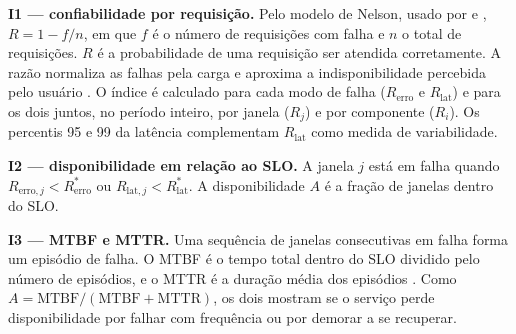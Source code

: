 \textbf{I1 — confiabilidade por requisição.} Pelo modelo de Nelson, usado
por  e , $R = 1-f/n$, em que $f$ é o número de requisições com falha e $n$ o total de
requisições. $R$ é a probabilidade de uma requisição ser atendida
corretamente. A razão normaliza as falhas pela carga \cite{tian2004} e
aproxima a indisponibilidade percebida pelo usuário
\cite{alvidrez2016risk}. O índice é calculado para cada modo de falha
($R_{\mathrm{erro}}$ e $R_{\mathrm{lat}}$) e para os dois juntos, no
período inteiro, por janela ($R_j$) e por componente ($R_i$). Os percentis
95 e 99 da latência complementam $R_{\mathrm{lat}}$ como medida de
variabilidade.

\textbf{I2 — disponibilidade em relação ao SLO.} A janela $j$ está em
falha quando $R_{\mathrm{erro},j} < R^{*}_{\mathrm{erro}}$ ou
$R_{\mathrm{lat},j} < R^{*}_{\mathrm{lat}}$. A disponibilidade $A$ é a fração de janelas
dentro do SLO.

\textbf{I3 — MTBF e MTTR.} Uma sequência de janelas consecutivas em falha
forma um episódio de falha. O MTBF é o tempo total dentro do SLO dividido
pelo número de episódios, e o MTTR é a duração média dos episódios
\cite{oconnor2012}. Como $A = \mathrm{MTBF}/(\mathrm{MTBF}+\mathrm{MTTR})$, os dois
mostram se o serviço perde disponibilidade por falhar com frequência ou
por demorar a se recuperar.
